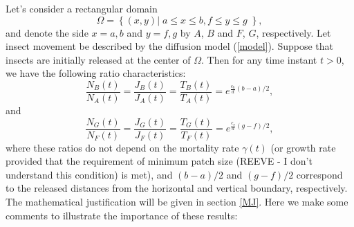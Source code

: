 \documentclass[11pt]{article}
\begin{document}
Let's consider a rectangular domain 
\[\Omega=\left\{(x, y)|\; a\leq x\leq b, f\leq y\leq g\;\right\},\]
and denote the side $x=a, b$ and $y=f, g$ by $A$, $B$ and $F$, $G$, respectively.  
Let insect movement be described by the diffusion model (\ref{model}). Suppose that insects are initially released at the center of $\Omega$. Then for any time instant $t>0$, we have the following ratio characteristics:
\[\frac{N_B(t)}{N_A(t)}=\frac{J_B(t)}{J_A(t)}=\frac{T_B(t)}{T_A(t)}=e^{\frac{c_h}{d}(b-a)/2},\]
and
\[\frac{N_G(t)}{N_F(t)}=\frac{J_G(t)}{J_F(t)}=\frac{T_G(t)}{T_F(t)}=e^{\frac{c_v}{d}(g-f)/2},\]
where these ratios do not depend on the mortality rate $\gamma(t)$ (or growth rate provided that the requirement of minimum patch size (REEVE - I don't understand this condition) is met), and $(b-a)/2$ and $(g-f)/2$ correspond to the released distances from the horizontal and vertical boundary, respectively. The mathematical justification will be given in section \ref{MJ}. Here we make some comments to illustrate the importance of these results:
\end{document}
